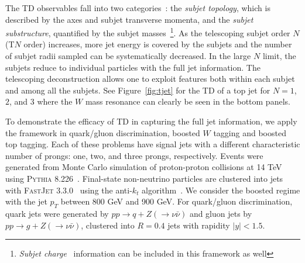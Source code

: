 \documentclass[notoc,preprintnumbers]{JHEP3}
\begin{document}
The TD observables fall into two categories~\cite{Chien:2017xrb}: the {\sl subjet topology}, which is described by the axes and subjet transverse momenta, and the {\sl subjet substructure}, quantified by the subjet masses~\footnote{{\sl Subjet charge}~\cite{Krohn:2012fg} information can be included in this framework as well}. As the telescoping subjet order $N$ (T$N$ order) increases, more jet energy is covered by the subjets and the number of subjet radii sampled can be systematically decreased. In the large $N$ limit, the subjets reduce to individual particles with the full jet information. The telescoping deconstruction allows one to exploit features both within each subjet and among all the subjets. See Figure~\ref{fig:tjet} for the TD of a top jet for $N = 1$, $2$, and $3$ where the $W$ mass resonance can clearly be seen in the bottom panels.

To demonstrate the efficacy of TD in capturing the full jet information, we apply the framework in quark/gluon discrimination, boosted $W$ tagging and boosted top tagging. Each of these problems have signal jets with a different characteristic number of prongs: one, two, and three prongs, respectively. Events were generated from Monte Carlo simulation of proton-proton collisions at 14 TeV using \textsc{Pythia} 8.226~\cite{Sjostrand:2007gs}. Final-state non-neutrino particles are clustered into jets with \textsc{FastJet} 3.3.0~\cite{Cacciari:2011ma} using the anti-$k_t$ algorithm~\cite{Cacciari:2008gp}. We consider the boosted regime with the jet $p_T$ between 800 GeV and 900 GeV. For quark/gluon discrimination, quark jets were generated by $pp\to q+Z(\to\nu\bar\nu)$ and gluon jets by $pp\to g + Z(\to\nu\bar\nu)$, clustered into $R=0.4$ jets with rapidity $|y|<1.5$.
\end{document}
